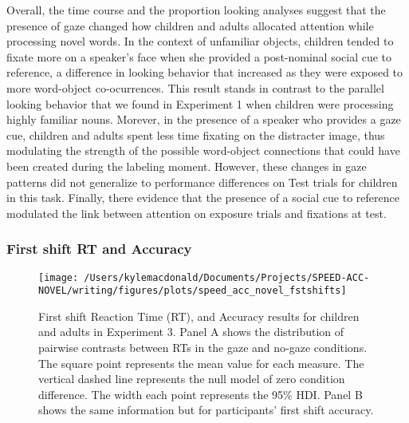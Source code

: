 \documentclass[man,floatsintext]{apa6}
\begin{document}
Overall, the time course and the proportion looking analyses suggest
that the presence of gaze changed how children and adults allocated
attention while processing novel words. In the context of unfamiliar
objects, children tended to fixate more on a speaker's face when she
provided a post-nominal social cue to reference, a difference in looking
behavior that increased as they were exposed to more word-object
co-ocurrences. This result stands in contrast to the parallel looking
behavior that we found in Experiment 1 when children were processing
highly familiar nouns. Morever, in the presence of a speaker who
provides a gaze cue, children and adults spent less time fixating on the
distracter image, thus modulating the strength of the possible
word-object connections that could have been created during the labeling
moment. However, these changes in gaze patterns did not generalize to
performance differences on Test trials for children in this task.
Finally, there evidence that the presence of a social cue to reference
modulated the link between attention on exposure trials and fixations at
test.

\subsubsection{First shift RT and
Accuracy}\label{first-shift-rt-and-accuracy}

\begin{figure}[!t]

{\centering \texttt{[image: /Users/kylemacdonald/Documents/Projects/SPEED-ACC-NOVEL/writing/figures/plots/speed\_acc\_novel\_fstshifts]} 

}

\caption{First shift Reaction Time (RT), and Accuracy results for children and adults in Experiment 3. Panel A shows the distribution of pairwise contrasts between RTs in the gaze and no-gaze conditions. The square point represents the mean value for each measure. The vertical dashed line represents the null model of zero condition difference. The width each point represents the 95\% HDI. Panel B shows the same information but for participants' first shift accuracy.}\label{fig:speed-acc-novel-shifts}
\end{figure}
\end{document}
